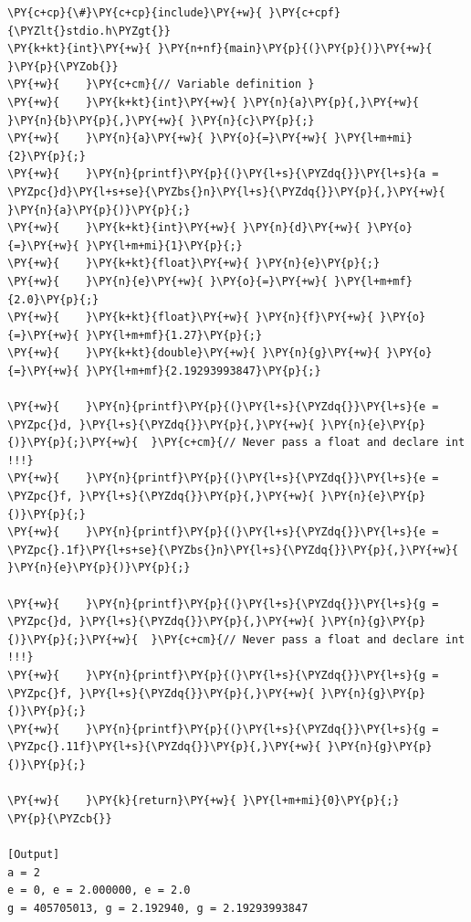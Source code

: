 \begin{Verbatim}[label=\makebox{\url{https://github.com/lucabaldini/cmepda/tree/master/slides/latex/snippets/variables_and_printf.c}},commandchars=\\\{\}]
\PY{c+cp}{\#}\PY{c+cp}{include}\PY{+w}{ }\PY{c+cpf}{\PYZlt{}stdio.h\PYZgt{}}
\PY{k+kt}{int}\PY{+w}{ }\PY{n+nf}{main}\PY{p}{(}\PY{p}{)}\PY{+w}{ }\PY{p}{\PYZob{}}
\PY{+w}{    }\PY{c+cm}{// Variable definition }
\PY{+w}{    }\PY{k+kt}{int}\PY{+w}{ }\PY{n}{a}\PY{p}{,}\PY{+w}{ }\PY{n}{b}\PY{p}{,}\PY{+w}{ }\PY{n}{c}\PY{p}{;}
\PY{+w}{    }\PY{n}{a}\PY{+w}{ }\PY{o}{=}\PY{+w}{ }\PY{l+m+mi}{2}\PY{p}{;}
\PY{+w}{    }\PY{n}{printf}\PY{p}{(}\PY{l+s}{\PYZdq{}}\PY{l+s}{a = \PYZpc{}d}\PY{l+s+se}{\PYZbs{}n}\PY{l+s}{\PYZdq{}}\PY{p}{,}\PY{+w}{ }\PY{n}{a}\PY{p}{)}\PY{p}{;}
\PY{+w}{    }\PY{k+kt}{int}\PY{+w}{ }\PY{n}{d}\PY{+w}{ }\PY{o}{=}\PY{+w}{ }\PY{l+m+mi}{1}\PY{p}{;}
\PY{+w}{    }\PY{k+kt}{float}\PY{+w}{ }\PY{n}{e}\PY{p}{;}
\PY{+w}{    }\PY{n}{e}\PY{+w}{ }\PY{o}{=}\PY{+w}{ }\PY{l+m+mf}{2.0}\PY{p}{;}
\PY{+w}{    }\PY{k+kt}{float}\PY{+w}{ }\PY{n}{f}\PY{+w}{ }\PY{o}{=}\PY{+w}{ }\PY{l+m+mf}{1.27}\PY{p}{;}
\PY{+w}{    }\PY{k+kt}{double}\PY{+w}{ }\PY{n}{g}\PY{+w}{ }\PY{o}{=}\PY{+w}{ }\PY{l+m+mf}{2.19293993847}\PY{p}{;}

\PY{+w}{    }\PY{n}{printf}\PY{p}{(}\PY{l+s}{\PYZdq{}}\PY{l+s}{e = \PYZpc{}d, }\PY{l+s}{\PYZdq{}}\PY{p}{,}\PY{+w}{ }\PY{n}{e}\PY{p}{)}\PY{p}{;}\PY{+w}{  }\PY{c+cm}{// Never pass a float and declare int !!!}
\PY{+w}{    }\PY{n}{printf}\PY{p}{(}\PY{l+s}{\PYZdq{}}\PY{l+s}{e = \PYZpc{}f, }\PY{l+s}{\PYZdq{}}\PY{p}{,}\PY{+w}{ }\PY{n}{e}\PY{p}{)}\PY{p}{;}
\PY{+w}{    }\PY{n}{printf}\PY{p}{(}\PY{l+s}{\PYZdq{}}\PY{l+s}{e = \PYZpc{}.1f}\PY{l+s+se}{\PYZbs{}n}\PY{l+s}{\PYZdq{}}\PY{p}{,}\PY{+w}{ }\PY{n}{e}\PY{p}{)}\PY{p}{;}

\PY{+w}{    }\PY{n}{printf}\PY{p}{(}\PY{l+s}{\PYZdq{}}\PY{l+s}{g = \PYZpc{}d, }\PY{l+s}{\PYZdq{}}\PY{p}{,}\PY{+w}{ }\PY{n}{g}\PY{p}{)}\PY{p}{;}\PY{+w}{  }\PY{c+cm}{// Never pass a float and declare int !!!}
\PY{+w}{    }\PY{n}{printf}\PY{p}{(}\PY{l+s}{\PYZdq{}}\PY{l+s}{g = \PYZpc{}f, }\PY{l+s}{\PYZdq{}}\PY{p}{,}\PY{+w}{ }\PY{n}{g}\PY{p}{)}\PY{p}{;}
\PY{+w}{    }\PY{n}{printf}\PY{p}{(}\PY{l+s}{\PYZdq{}}\PY{l+s}{g = \PYZpc{}.11f}\PY{l+s}{\PYZdq{}}\PY{p}{,}\PY{+w}{ }\PY{n}{g}\PY{p}{)}\PY{p}{;}

\PY{+w}{    }\PY{k}{return}\PY{+w}{ }\PY{l+m+mi}{0}\PY{p}{;}
\PY{p}{\PYZcb{}}

[Output]
a = 2
e = 0, e = 2.000000, e = 2.0
g = 405705013, g = 2.192940, g = 2.19293993847
\end{Verbatim}